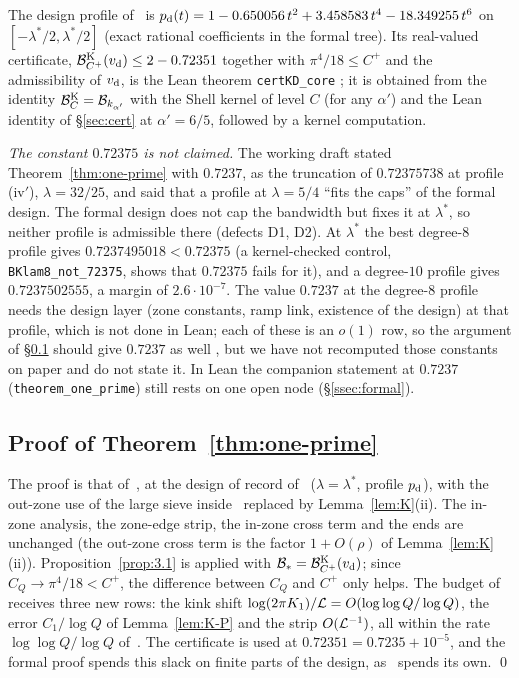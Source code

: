 The design profile of~\cite{DSouza} is $p_{\rm d}(t)=1-0.650056\,t^2+3.458583\,t^4-18.349255\,t^6$ on $[-\lambda^*/2,\lambda^*/2]$ (exact rational
coefficients in the formal tree). Its real-valued certificate, $\mathcal B^{\rm K}_{C^+}(v_{\rm d})\le2-0.72351$ together with $\pi^4/18\le C^+$ and the
admissibility of $v_{\rm d}$, is the Lean theorem \texttt{certKD\_core} \tagL; it is obtained from the identity
$\mathcal B^{\rm K}_C=\mathcal B_{k_{\alpha'}}$ with the Shell kernel of level $C$ (for any $\alpha'$) and the Lean identity of \S\ref{sec:cert} at
$\alpha'=6/5$, followed by a kernel computation.

\emph{The constant $0.72375$ is not claimed.} The working draft stated Theorem~\ref{thm:one-prime} with $0.7237$, as the truncation of
$0.72375738$ at profile (iv$'$), $\lambda=32/25$, and said that a profile at $\lambda=5/4$ ``fits the caps'' of the formal design. The formal
design does not cap the bandwidth but fixes it at $\lambda^*$, so neither profile is admissible there (defects D1, D2). At $\lambda^*$ the
best degree-$8$ profile gives $0.7237495018<0.72375$ (a kernel-checked control, \texttt{BKlam8\_not\_72375}, shows that $0.72375$ fails for
it), and a degree-$10$ profile gives $0.7237502555$, a margin of $2.6\cdot10^{-7}$. The value $0.7237$ at the degree-$8$ profile needs the
design layer (zone constants, ramp link, existence of the design) at that profile, which is not done in Lean; each of these is an $o(1)$ row,
so the argument of \S\ref{ssec:thm1prime} should give $0.7237$ as well \tagM, but we have not recomputed those constants on paper and do not
state it. In Lean the companion statement at $0.7237$ (\texttt{theorem\_one\_prime}) still rests on one open node (\S\ref{ssec:formal}).

\subsection{Proof of Theorem~\ref{thm:one-prime}}\label{ssec:thm1prime}
The proof is that of~\cite[Theorem~1]{DSouza}, at the design of record of~\cite{DSouza} ($\lambda=\lambda^*$, profile $p_{\rm d}$), with the
out-zone use of the large sieve inside~\cite[Lemma~4.3]{DSouza} replaced by Lemma~\ref{lem:K}(ii). The in-zone analysis, the zone-edge strip,
the in-zone cross term and the ends are unchanged (the out-zone cross term is the factor $1+O(\rho)$ of Lemma~\ref{lem:K}(ii)). Proposition~\ref{prop:3.1} is applied with $\mathcal B_*=\mathcal B^{\rm K}_{C^+}(v_{\rm d})$; since
$C_Q\to\pi^4/18<C^+$, the difference between $C_Q$ and $C^+$ only helps. The budget of~\cite[\S10.3]{DSouza} receives three new rows:
the kink shift $\log(2\pi K_1)/\mathcal L=O(\log\log Q/\log Q)$, the error $C_1/\log Q$ of Lemma~\ref{lem:K-P} and the strip $O(\mathcal L^{-1})$, all within
the rate $\log\log Q/\log Q$ of~\cite{DSouza}. The certificate is used at $0.72351=0.7235+10^{-5}$, and the formal proof spends this slack
on finite parts of the design, as~\cite{DSouza} spends its own. \qed

